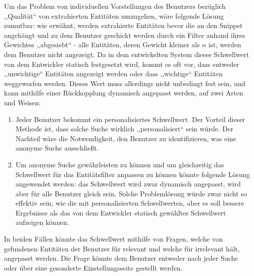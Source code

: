 Um das Problem von individuellen Vorstellungen des Benutzers bezüglich ,,Qualität`` von extrahierten Entitäten umzugehen, wäre folgende Lösung zumutbar: wie erwähnt, werden extrahierte Entitäten bevor die an den Snippet angehängt und zu dem Benutzer geschickt werden durch ein Filter anhand ihres Gewichtes ,,abgesiebt`` - alle Entitäten, deren Gewicht kleiner als $n$ ist, werden dem Benutzer nicht angezeigt. Da in dem entwickelten System dieses Schwellwert von dem Entwickler statisch festgesetzt wird, kommt es oft vor, dass entweder ,,unwichtige`` Entitäten angezeigt werden oder dass ,,wichtige`` Entitäten weggeworfen werden. Dieses Wert muss allerdings nicht unbedingt fest sein, und kann mithilfe einer Rückkopplung dynamisch angepasst werden, auf zwei Arten und Weisen:
\begin{enumerate}
\item Jeder Benutzer bekommt ein personalisiertes Schwellwert. Der Vorteil dieser Methode ist, dass solche Suche wirklich ,,personalisiert`` sein würde. Der Nachteil wäre die Notwendigkeit, den Benutzer zu identifizieren, was eine anonyme Suche ausschließt. 
\item Um anonyme Suche gewährleisten zu können und um gleichzeitig das Schwellwert für das Entitätsfilter anpassen zu können könnte folgende Lösung angewendet werden: das Schwellwert wird zwar dynamisch angepasst, wird aber für alle Benutzer gleich sein. Solche Problemlösung würde zwar nicht so effektiv sein, wie die mit personalisierten Schwellwerten, aber es soll bessere Ergebnisse als das von dem Entwickler statisch gewähltes Schwellwert aufzeigen können.
\end{enumerate}
In beiden Fällen könnte das Schwellwert mithilfe von Fragen, welche von gefundenen Entitäten der Benutzer für relevant und welche für irrelevant hält, angepasst werden. Die Frage könnte dem Benutzer entweder nach jeder Suche oder über eine gesonderte Einstellungsseite gestellt werden.

